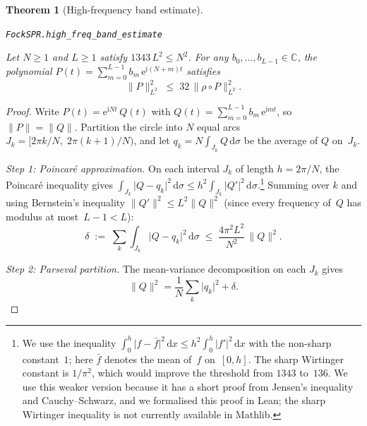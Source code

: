 \documentclass[11pt]{amsart}
\newtheorem{theorem}{Theorem}[section]
\theoremstyle{definition}
\theoremstyle{remark}
\begin{document}
\begin{theorem}[High-frequency band estimate]\label{thm:high-freq}
\par\noindent\texttt{FockSPR.high\_freq\_band\_estimate}\par\smallskip
Let $N \ge 1$ and $L \ge 1$ satisfy $1343\, L^2 \le N^2$.
For any $b_0, \dots, b_{L-1} \in \mathbb{C}$, the polynomial
$P(t) = \sum_{m=0}^{L-1} b_m\, \mathrm{e}^{\mathrm{i}(N+m)t}$ satisfies
\[
\lVert P \rVert_{L^2}^2
\;\le\;
32\, \lVert \rho \circ P \rVert_{L^2}^2.
\]
\end{theorem}

\begin{proof}
Write $P(t) = \mathrm{e}^{\mathrm{i} Nt}\,Q(t)$ with
$Q(t) = \sum_{m=0}^{L-1} b_m\,\mathrm{e}^{\mathrm{i} mt}$, so $\lVert P \rVert = \lVert Q \rVert$.
Partition the circle into $N$ equal arcs
$J_k = [2\pi k/N,\; 2\pi(k+1)/N)$, and let
$q_k = N\!\int_{J_k}\! Q\,\mathrm{d}\sigma$ be the average of $Q$ on~$J_k$.

\medskip
\noindent
\emph{Step 1: Poincar\'e approximation.}\;
On each interval $J_k$ of length $h = 2\pi/N$, the Poincar\'e
inequality gives
$\int_{J_k}\lvert Q - q_k \rvert^2\,\mathrm{d}\sigma \le h^2\int_{J_k}\lvert Q' \rvert^2\,
\mathrm{d}\sigma$.\footnote{We use the inequality
$\int_0^h \lvert f - \bar f \rvert^2\,\mathrm{d} x
\le h^2\int_0^h\lvert f' \rvert^2\,\mathrm{d} x$
with the non-sharp constant~$1$; here $\bar f$ denotes the mean of~$f$
on~$[0,h]$.  The sharp Wirtinger
constant is $1/\pi^2$, which would improve the threshold from $1343$ to~$136$.
We use this weaker version because it has a short proof from Jensen's
inequality and Cauchy--Schwarz, and we formalised this proof in Lean; the
sharp Wirtinger inequality is not currently available in Mathlib.}
Summing over $k$ and using Bernstein's inequality $\lVert Q' \rVert^2 \le L^2\lVert Q \rVert^2$
(since every frequency of~$Q$ has modulus at most~$L{-}1 < L$):
\begin{equation}\label{eq:delta}
\delta \;:=\; \sum_{k} \int_{J_k}\lvert Q - q_k \rvert^2\,\mathrm{d}\sigma
\;\le\; \frac{4\pi^2 L^2}{N^2}\,\lVert Q \rVert^2.
\end{equation}

\noindent
\emph{Step 2: Parseval partition.}\;
The mean-variance decomposition on each $J_k$ gives
\begin{equation}\label{eq:parseval-partition}
\lVert Q \rVert^2
= \frac{1}{N}\sum_{k}\lvert q_k \rvert^2 + \delta.
\end{equation}


\end{proof}
\end{document}
